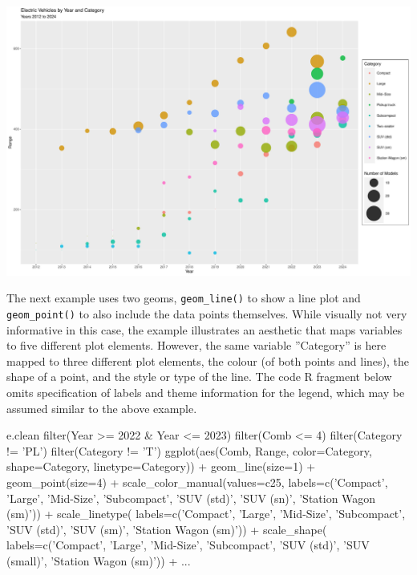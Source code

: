\begin{center}
  \includegraphics[width=.8\textwidth]{fuel.pointsSize.pdf}
\end{center}

The next example uses two geoms, \texttt{geom\_line()} to show a line plot and \texttt{geom\_point()} to also include the data points themselves. While visually not very informative in this case, the example illustrates an aesthetic that maps variables to five different plot elements. However, the same variable ''Category'' is here mapped to three different plot elements, the colour (of both points and lines), the shape of a point, and the style or type of the line. The code R fragment below omits specification of labels and theme information for the legend, which may be assumed similar to the above example.  

\begin{samepage}
\begin{Rcode}
e.clean %
  filter(Year >= 2022 & Year <= 2023) %
  filter(Comb <= 4) %
  filter(Category != 'PL') %
  filter(Category != 'T') %
ggplot(aes(Comb, Range, 
           color=Category, 
           shape=Category, 
           linetype=Category)) +
  geom_line(size=1) + 
  geom_point(size=4) + 
  scale_color_manual(values=c25, 
    labels=c('Compact', 'Large', 'Mid-Size', 
             'Subcompact', 'SUV (std)', 
             'SUV (sn)', 'Station Wagon (sm)')) + 
  scale_linetype(
    labels=c('Compact', 'Large', 'Mid-Size', 
             'Subcompact', 'SUV (std)', 
             'SUV (sm)', 'Station Wagon (sm)')) + 
  scale_shape(
    labels=c('Compact', 'Large', 'Mid-Size', 
             'Subcompact', 'SUV (std)', 
             'SUV (small)', 'Station Wagon (sm)')) + 
...
\end{Rcode}
\end{samepage}

